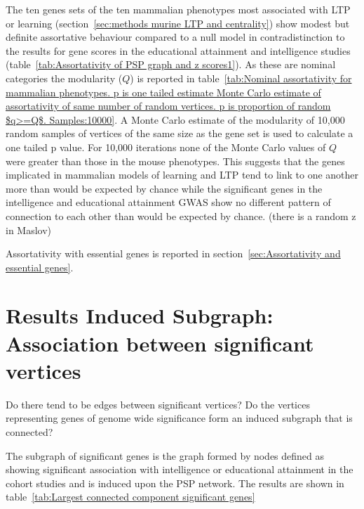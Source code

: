    The ten genes sets of the ten mammalian phenotypes most associated with LTP or learning (section~\ref{sec:methods murine LTP and centrality}) show modest but definite assortative behaviour compared to a null model in contradistinction to the results for gene scores in the educational attainment and intelligence studies (table~\ref{tab:Assortativity of PSP graph and z scores1}). As these are nominal categories the modularity ($Q$) is reported in table~\ref{tab:Nominal assortativity for mammalian phenotypes. p is one tailed estimate Monte Carlo estimate of assortativity of same number of random vertices. p is proportion of random $q>=Q$. Samples:10000}. A Monte Carlo estimate of the modularity of 10,000 random samples of vertices of the same size as the gene set is used to calculate a one tailed p value. For 10,000 iterations none of the Monte Carlo values of $Q$ were greater than those in the mouse phenotypes. This suggests that the genes implicated in mammalian models of learning and LTP tend to link to one another more than would be expected by chance while the significant genes in the intelligence and educational attainment GWAS show no different pattern of connection to each other than would be expected by chance. (there is a random z in Maslov)
 
 
 
 Assortativity with essential genes is reported in section~\ref{sec:Assortativity and essential genes}.
 \section{Results Induced Subgraph: Association between significant vertices}
Do there tend to be edges between significant vertices? Do the vertices representing genes of genome wide significance form an induced subgraph that is connected?



The subgraph of significant genes is the graph formed by nodes defined as showing significant association with intelligence or educational attainment in the cohort studies and is induced upon the PSP network. The results are shown in table~\ref{tab:Largest connected component significant genes}

